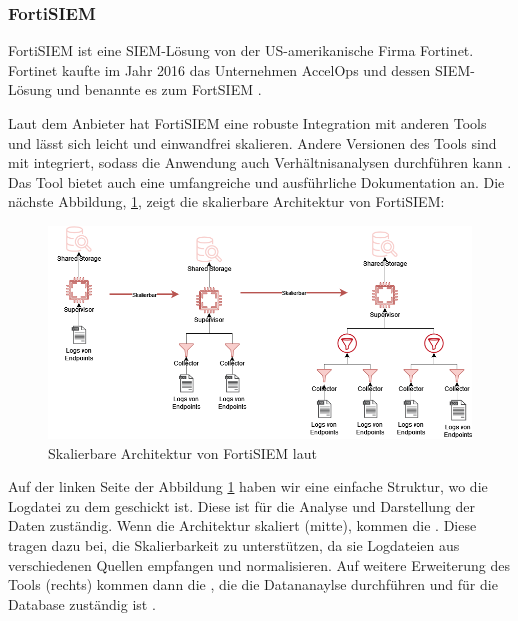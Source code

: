 \newpage
\subsubsection{FortiSIEM}
FortiSIEM ist eine \gls{SIEM}-Lösung von der US-amerikanische Firma Fortinet. Fortinet kaufte im Jahr 2016 das Unternehmen AccelOps und dessen \gls{SIEM}-Lösung und benannte es zum FortSIEM \citep{Fortinet_Press}.

Laut dem Anbieter hat FortiSIEM eine robuste Integration mit anderen Tools und lässt sich leicht und einwandfrei skalieren. Andere Versionen des Tools sind mit  integriert, sodass die Anwendung auch Verhältnisanalysen durchführen kann \citep{Fortinet_Solutions}. Das Tool bietet auch eine umfangreiche und ausführliche Dokumentation an. Die nächste Abbildung, \ref{fig:FortiSIEM}, zeigt die skalierbare Architektur von FortiSIEM:

\begin{figure}[H]
   \centering
   \includegraphics[width=1\textwidth]{assets/FortSIEM.drawio.png}
   \caption[Skalierbare Architektur von FortiSIEM]
   {Skalierbare Architektur von FortiSIEM laut \cite{Fortinet_Arch} }
   \label{fig:FortiSIEM}
   \centering
\end{figure}

Auf der linken Seite der Abbildung \ref{fig:FortiSIEM} haben wir eine einfache Struktur, wo die Logdatei zu dem  geschickt ist. Diese ist für die Analyse und Darstellung der Daten zuständig. Wenn die Architektur skaliert (mitte), kommen die . Diese tragen dazu bei, die Skalierbarkeit zu unterstützen, da sie Logdateien aus verschiedenen Quellen empfangen und normalisieren. Auf weitere Erweiterung des Tools (rechts) kommen dann die , die die Datananaylse durchführen und für die Database zuständig ist \citep{Fortinet_Key}.


